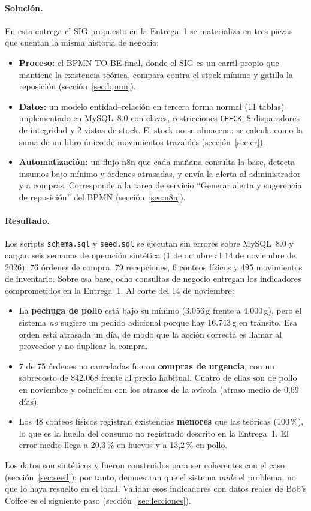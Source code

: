 \documentclass[11pt,letterpaper]{article}
\begin{document}
\paragraph{Solución.} En esta entrega el SIG propuesto en la Entrega~1 se materializa en tres piezas que cuentan la misma historia de negocio:
\begin{itemize}[leftmargin=*,itemsep=2pt]
  \item \textbf{Proceso:} el BPMN TO-BE final, donde el SIG es un carril propio que mantiene la existencia teórica, compara contra el stock mínimo y gatilla la reposición (sección~\ref{sec:bpmn}).
  \item \textbf{Datos:} un modelo entidad--relación en tercera forma normal (11 tablas) implementado en MySQL~8.0 con claves, restricciones \texttt{CHECK}, 8 disparadores de integridad y 2 vistas de stock. El stock no se almacena: se calcula como la suma de un libro único de movimientos trazables (sección~\ref{sec:er}).
  \item \textbf{Automatización:} un flujo n8n que cada mañana consulta la base, detecta insumos bajo mínimo y órdenes atrasadas, y envía la alerta al administrador y a compras. Corresponde a la tarea de servicio ``Generar alerta y sugerencia de reposición'' del BPMN (sección~\ref{sec:n8n}).
\end{itemize}

\paragraph{Resultado.} Los scripts \texttt{schema.sql} y \texttt{seed.sql} se ejecutan sin errores sobre MySQL~8.0 y cargan seis semanas de operación sintética (1 de octubre al 14 de noviembre de 2026): 76 órdenes de compra, 79 recepciones, 6 conteos físicos y 495 movimientos de inventario. Sobre esa base, ocho consultas de negocio entregan los indicadores comprometidos en la Entrega~1. Al corte del 14 de noviembre:
\begin{itemize}[leftmargin=*,itemsep=2pt]
  \item La \textbf{pechuga de pollo} está bajo su mínimo (3.056\,g frente a 4.000\,g), pero el sistema \emph{no} sugiere un pedido adicional porque hay 16.743\,g en tránsito. Esa orden está atrasada un día, de modo que la acción correcta es llamar al proveedor y no duplicar la compra.
  \item 7 de 75 órdenes no canceladas fueron \textbf{compras de urgencia}, con un sobrecosto de \$42.068 frente al precio habitual. Cuatro de ellas son de pollo en noviembre y coinciden con los atrasos de la avícola (atraso medio de 0,69 días).
  \item Los 48 conteos físicos registran existencias \textbf{menores} que las teóricas (100\,\%), lo que es la huella del consumo no registrado descrito en la Entrega~1. El error medio llega a 20,3\,\% en huevos y a 13,2\,\% en pollo.
\end{itemize}
Los datos son sintéticos y fueron construidos para ser coherentes con el caso (sección~\ref{sec:seed}); por tanto, demuestran que el sistema \emph{mide} el problema, no que lo haya resuelto en el local. Validar esos indicadores con datos reales de Bob's Coffee es el siguiente paso (sección~\ref{sec:lecciones}).
\end{document}
